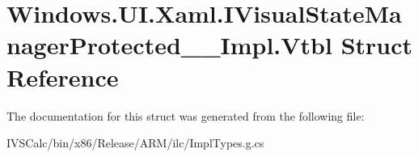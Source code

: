\hypertarget{struct_windows_1_1_u_i_1_1_xaml_1_1_i_visual_state_manager_protected_____impl_1_1_vtbl}{}\section{Windows.\+U\+I.\+Xaml.\+I\+Visual\+State\+Manager\+Protected\+\_\+\+\_\+\+Impl.\+Vtbl Struct Reference}
\label{struct_windows_1_1_u_i_1_1_xaml_1_1_i_visual_state_manager_protected_____impl_1_1_vtbl}


The documentation for this struct was generated from the following file\+:\begin{DoxyCompactItemize}
\item 
I\+V\+S\+Calc/bin/x86/\+Release/\+A\+R\+M/ilc/Impl\+Types.\+g.\+cs\end{DoxyCompactItemize}
